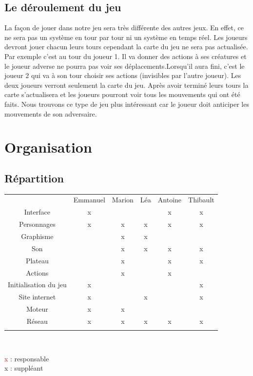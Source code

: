 \documentclass[12pt]{extarticle}
\begin{document}
\subsection{Le déroulement du jeu}

La façon de jouer dans notre jeu sera très différente des autres jeux. En effet, ce ne sera pas un système en tour par tour ni un système en temps réel. Les joueurs devront jouer chacun leurs tours cependant la carte du jeu ne sera pas actualisée. Par exemple c’est au tour du joueur 1. Il va donner des actions à ses créatures et le joueur adverse ne pourra pas voir ses déplacements.Lorsqu’il aura fini, c’est le joueur 2 qui va à son tour choisir ses actions (invisibles par l’autre joueur). Les deux joueurs verront seulement la carte du jeu. Après avoir terminé leurs tours la carte s’actualisera et les joueurs pourront voir tous les mouvements qui ont été faits. Nous trouvons ce type de jeu plus intéressant car le joueur doit anticiper les mouvements de son adversaire. 

\section{Organisation}

\subsection{Répartition}

\begin{table}[!ht]
	\begin{center}
		\begin{tabular}{ | c || c | c | c | c | c | }
			\cline{2-6} \multicolumn{1}{c|}{}& Emmanuel & Marion & Léa & Antoine & Thibault \\ \hhline{-::=:=:=:=:=:}
			 Interface & x &&& \color{red} x & x \\ \hhline{-||-----|}
			 Personnages & x & x & \color{red} x & x & x \\ \hhline{-||-----|}
			 Graphisme && x & \color{red} x && \\ \hhline{-||-----|}
			 Son && x & x & x & \color{red} x \\ \hhline{-||-----|}
			 Plateau && \color{red} x && x & x \\ \hhline{-||-----|}
			 Actions && x && \color{red} x & \\ \hhline{-||-----|}
			 Initialisation du jeu & \color{red} x &&&& x \\ \hhline{-||-----|}
			 Site internet & x && x && \color{red} x \\ \hhline{-||-----|}
			 Moteur & \color{red} x & \color{red} x &&& \\ \hhline{-||-----|}
			 Réseau & x & x & \color{red} x & x & x \\ \hhline{-||-----|}
		\end{tabular}\\ 
	\end{center}
	\vspace{1cm}
	\textcolor{red}{x} : responsable\\
	x : suppléant
\end{table}
\end{document}
